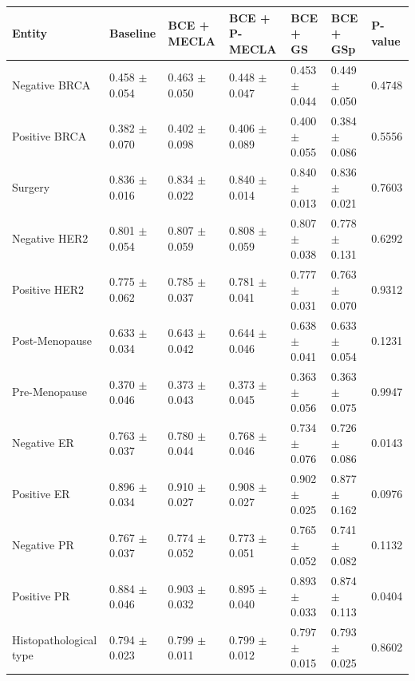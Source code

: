 \begin{tabular}{lllllll}
\toprule
Entity & Baseline & BCE + MECLA & BCE + P-MECLA & BCE + GS & BCE + GSp & P-value \\
\midrule
Negative BRCA & 0.458 $\pm$ 0.054 & 0.463 $\pm$ 0.050 & 0.448 $\pm$ 0.047 & 0.453 $\pm$ 0.044 & 0.449 $\pm$ 0.050 & 0.4748 \\
Positive BRCA & 0.382 $\pm$ 0.070 & 0.402 $\pm$ 0.098 & 0.406 $\pm$ 0.089 & 0.400 $\pm$ 0.055 & 0.384 $\pm$ 0.086 & 0.5556 \\
Surgery & 0.836 $\pm$ 0.016 & 0.834 $\pm$ 0.022 & 0.840 $\pm$ 0.014 & 0.840 $\pm$ 0.013 & 0.836 $\pm$ 0.021 & 0.7603 \\
Negative HER2 & 0.801 $\pm$ 0.054 & 0.807 $\pm$ 0.059 & 0.808 $\pm$ 0.059 & 0.807 $\pm$ 0.038 & 0.778 $\pm$ 0.131 & 0.6292 \\
Positive HER2 & 0.775 $\pm$ 0.062 & 0.785 $\pm$ 0.037 & 0.781 $\pm$ 0.041 & 0.777 $\pm$ 0.031 & 0.763 $\pm$ 0.070 & 0.9312 \\
Post-Menopause & 0.633 $\pm$ 0.034 & 0.643 $\pm$ 0.042 & 0.644 $\pm$ 0.046 & 0.638 $\pm$ 0.041 & 0.633 $\pm$ 0.054 & 0.1231 \\
Pre-Menopause & 0.370 $\pm$ 0.046 & 0.373 $\pm$ 0.043 & 0.373 $\pm$ 0.045 & 0.363 $\pm$ 0.056 & 0.363 $\pm$ 0.075 & 0.9947 \\
Negative ER & 0.763 $\pm$ 0.037 & 0.780 $\pm$ 0.044 & 0.768 $\pm$ 0.046 & 0.734 $\pm$ 0.076 & 0.726 $\pm$ 0.086 & 0.0143 \\
Positive ER & 0.896 $\pm$ 0.034 & 0.910 $\pm$ 0.027 & 0.908 $\pm$ 0.027 & 0.902 $\pm$ 0.025 & 0.877 $\pm$ 0.162 & 0.0976 \\
Negative PR & 0.767 $\pm$ 0.037 & 0.774 $\pm$ 0.052 & 0.773 $\pm$ 0.051 & 0.765 $\pm$ 0.052 & 0.741 $\pm$ 0.082 & 0.1132 \\
Positive PR & 0.884 $\pm$ 0.046 & 0.903 $\pm$ 0.032 & 0.895 $\pm$ 0.040 & 0.893 $\pm$ 0.033 & 0.874 $\pm$ 0.113 & 0.0404 \\
Histopathological type & 0.794 $\pm$ 0.023 & 0.799 $\pm$ 0.011 & 0.799 $\pm$ 0.012 & 0.797 $\pm$ 0.015 & 0.793 $\pm$ 0.025 & 0.8602 \\
\bottomrule
\end{tabular}
